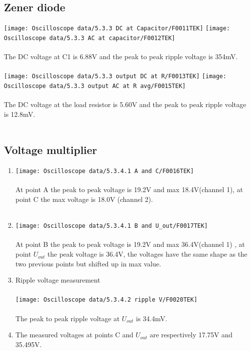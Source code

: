 \documentclass{article}
\begin{document}
			\subsection{Zener diode}
				\vspace{2cm}
				\texttt{[image: Oscilloscope data/5.3.3 DC at Capacitor/F0011TEK]}
				\texttt{[image: Oscilloscope data/5.3.3 AC at capacitor/F0012TEK]}\\\\
				The DC voltage at C1 is 6.88V and the peak to peak ripple voltage is 354mV.\\\\
				\texttt{[image: Oscilloscope data/5.3.3 output DC at R/F0013TEK]}
				\texttt{[image: Oscilloscope data/5.3.3 output AC at R avg/F0015TEK]}\\\\
				The DC voltage at the load resistor is 5.60V and the peak to peak ripple voltage is 12.8mV.\\\\\pagebreak
				
			\subsection{Voltage multiplier}
				\begin{enumerate}
					\item \texttt{[image: Oscilloscope data/5.3.4.1 A and C/F0016TEK]}\\\\
					At point A the peak to peak voltage is 19.2V and max 18.4V(channel 1), at point C the max voltage is 18.0V (channel 2).\\\\
					\item \texttt{[image: Oscilloscope data/5.3.4.1 B and U\_out/F0017TEK]}\\\\
					At point B the peak to peak voltage is 19.2V and max 36.4V(channel 1) , at point \(U_{out}\) the peak voltage is 36.4V, the voltages have the same shape as the two previous points but shifted up in max value.
					\item Ripple voltage measurement\\\\
					\texttt{[image: Oscilloscope data/5.3.4.2 ripple V/F0020TEK]}\\\\
					The peak to peak ripple voltage at \(U_{out}\) is 34.4mV.\\
					\item The measured voltages at points C and \(U_{out}\) are respectively 17.75V and 35.495V.
				\end{enumerate}
				
\end{document}
